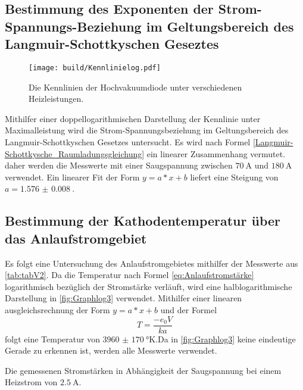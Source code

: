 \subsection{Bestimmung des Exponenten der Strom-Spannungs-Beziehung im Geltungsbereich des Langmuir-Schottkyschen Geseztes}
\begin{figure}
 \centering
 \caption{Die Kennlinien der Hochvakuumdiode unter verschiedenen Heizleistungen.}
 \texttt{[image: build/Kennlinielog.pdf]}
 \label{fig:Graphlog2}
\end{figure}
Mithilfer einer doppellogarithmischen Darstellung der Kennlinie unter Maximalleistung
 wird die Strom-Spannungsbeziehung im Geltungsbereich des Langmuir-Schottkyschen Gesetzes untersucht.
 Es wird nach Formel \eqref{Langmuir-Schottkysche_Raumladungsgleichung} ein linearer Zusammenhang vermutet.
daher werden die Messwerte mit einer Saugspannung zwischen $\SI{70}{\ampere}$
und $\SI{180}{\ampere}$ verwendet. Ein linearer Fit der Form $y = a*x+b$ liefert
eine Steigung von $a = \SI{1.576(8)}{}$.























\subsection{Bestimmung der Kathodentemperatur über das Anlaufstromgebiet}
Es folgt eine Untersuchung des Anlaufstromgebietes mithilfer der Messwerte aus \ref{tab:tabV2}.
Da die Temperatur nach Formel \ref{eq:Anlaufstromstärke} logarithmisch bezüglich
der Stromstärke verläuft, wird eine halblogarithmische Darstellung in
\ref{fig:Graphlog3} verwendet. Mithilfer einer linearen ausgleichsrechnung der Form
$y = a*x+b$ und der Formel
\begin{equation}
  T = \frac{-e_0 V}{k a}
  \end{equation}
  folgt eine Temperatur von $\SI{3960(170)}{\degree\kelvin}$.Da in \ref{fig:Graphlog3}
  keine eindeutige Gerade zu erkennen ist,
werden alle Messwerte verwendet.


 \begin{table}
  \centering
  \caption{Die gemessenen Stromstärken in Abhängigkeit der Saugspannung bei einem Heizstrom von $\SI{2,5}{\ampere}$.}
  
  \label{tab:tabV2}
 \end{table}

